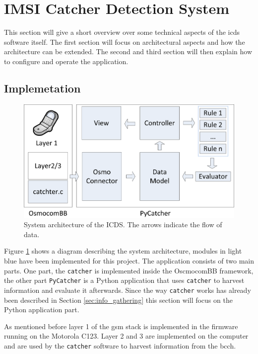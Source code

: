 \section{IMSI Catcher Detection System}
\label{sec:icds}
This section will give a short overview over some technical aspects of the \gls{icds} software itself.
The first section will focus on architectural aspects and how the architecture can be extended.
The second and third section will then explain how to configure and operate the application.

\subsection{Implemetation}
\begin{figure}
\centering
\includegraphics{../Images/Architecture_software}
\caption{System architecture of the ICDS. The arrows indicate the flow of data.}
\label{fig:architecture}
\end{figure}
Figure \ref{fig:architecture} shows a diagram describing the system architecture, modules in light blue have been implemented for this project.
The application consists of two main parts.
One part, the \texttt{catcher} is implemented inside the OscmocomBB framework, the other part \texttt{PyCatcher} is a Python application that uses \texttt{catcher} to harvest information and evaluate it afterwards.
Since the way \texttt{catcher} works has already been described in Section \ref{sec:info_gathering} this section will focus on the Python application part.

As mentioned before layer 1 of the \gls{gsm} stack is implemented in the firmware running on the Motorola C123.
Layer 2 and 3 are implemented on the computer and are used by the \texttt{catcher} software to harvest information from the \gls{bcch}.

